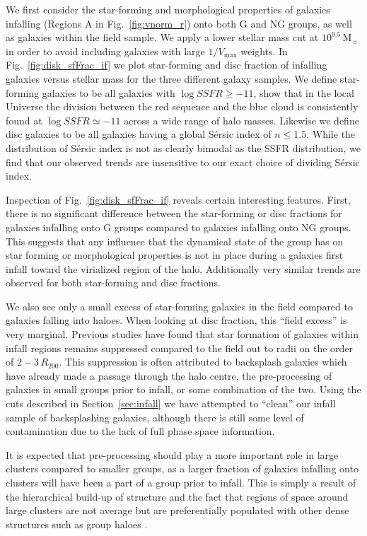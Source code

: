 \documentclass[a4paper,fleqn,usenatbib]{mnras}
\newcommand{\Msun}{\,\mathrm{M_{\sun}}}
\begin{document}
We first consider the star-forming and morphological properties of
galaxies infalling (Regions A in Fig.~\ref{fig:vnorm_r}) onto both G
and NG groups, as well as galaxies within the field sample.  We apply
a lower stellar mass cut at $10^{9.5}\Msun$ in order to avoid
including galaxies with large $1/V_\mathrm{max}$ weights.  In
Fig.~\ref{fig:disk_sfFrac_if} we plot star-forming and disc fraction
of infalling galaxies
versus stellar mass for the three different galaxy samples.  We define
star-forming galaxies to be all galaxies with $\log SSFR \ge -11$,
\citet{wetzel2012} show that in the local Universe the division
between the red sequence and the blue cloud is consistently found at
$\log SSFR \simeq -11$ across a wide range of halo masses.  Likewise
we define disc galaxies to be all galaxies having a global S\'{e}rsic
index of $n \le 1.5$.  While the distribution of S\'{e}rsic index is
not as clearly bimodal as the SSFR distribution, we find that our
observed trends are insensitive to our exact choice of dividing S\'{e}rsic
index.
\par
Inspection of Fig.~\ref{fig:disk_sfFrac_if} reveals certain
interesting features.  First, there is no significant difference
between the star-forming or disc fractions for galaxies infalling onto
G groups compared to galaxies infalling onto NG
groups.  This suggests that any influence that the dynamical state
of the group
has on star forming or morphological properties is not in place during
a galaxies first infall toward the virialized region of the halo.
Additionally very similar trends are observed for both star-forming and
disc fractions.
\par
We also see only a small excess of star-forming galaxies in the field
compared to galaxies falling into haloes.  When looking at disc fraction, this
``field excess'' is very marginal.
Previous studies \citep{lewis2002, gray2004, rines2005, verdugo2008}
have found that star formation of galaxies within infall regions
remains suppressed compared to the field out to radii on the order of
$2-3\,R_{200}$.  This suppression is often attributed to
backsplash galaxies which have already made a passage through the halo
centre, the pre-processing of galaxies in small groups prior to
infall, or some combination of the two.  Using the cuts described in
Section~\ref{sec:infall} we have attempted to ``clean'' our infall sample
of backsplashing galaxies, although there is still some level of
contamination due to the lack of full phase space information.
\par
It is expected that pre-processing
should play a more important role in large clusters compared to smaller
groups, as a larger fraction of galaxies infalling onto clusters will
have been a part of a group prior to infall.  This is
simply a result of the hierarchical build-up of structure and the
fact that regions of space around large clusters are not average but
are preferentially populated with other dense structures such as group
haloes \citep[e.g.][]{mo1996, wang2008}.
\end{document}
